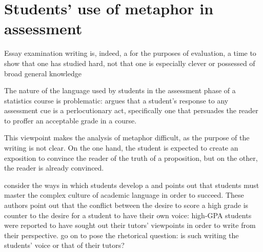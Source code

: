 %
%
%

\section{Students' use of metaphor in assessment}

\begin{singlespace}
\epigraph{Essay examination writing is, indeed, a  for
  the purposes of evaluation, a time to show that one has studied
  hard, not that one is especially clever or possessed of broad
  general knowledge}{}
\end{singlespace}

\noindent
The nature of the language used by students in the assessment phase of
a statistics course is problematic:  argues that a
student's response to any assessment cue is a perlocutionary act,
specifically one that persuades the reader to proffer an acceptable
grade in a course.

This viewpoint makes the analysis of metaphor difficult, as the
purpose of the writing is not clear.  On the one hand, the student is
expected to create an exposition to convince the reader of the truth
of a proposition, but on the other, the reader is already convinced.

 consider the ways in which students develop a
 and points out that students must master the complex
culture of academic language in order to succeed.  These authors point
out that the conflict between the desire to score a high grade is
counter to the desire for a student to have their own voice: high-GPA
students were reported to have sought out their tutors' viewpoints in
order to write from their perspective.   go on to pose
the rhetorical question: is such writing the students' voice or that
of their tutors?  

